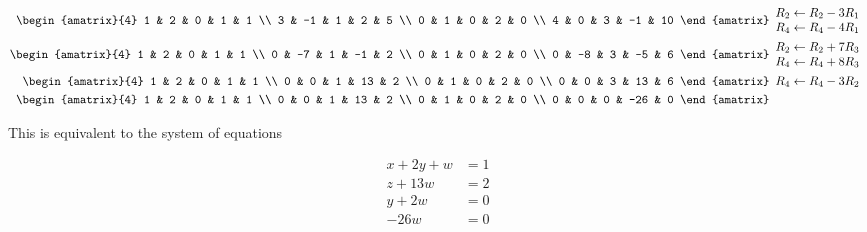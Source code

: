 \documentclass{article}
\begin{document}
\begin{align}
 \begin{amatrix}{4}
  1 & 2 & 0 & 1 & 1 \\
  3 & -1 & 1 & 2 & 5 \\
  0 & 1 & 0 & 2 & 0 \\
  4 & 0 & 3 & -1 & 10
 \end{amatrix}&
 \begin{array}{l}
  R_2 \leftarrow R_2 - 3R_1 \\ R_4 \leftarrow R_4 - 4R_1 
 \end{array}
 \nonumber \\
 \begin{amatrix}{4}
  1 & 2 & 0 & 1 & 1 \\
  0 & -7 & 1 & -1 & 2 \\
  0 & 1 & 0 & 2 & 0 \\
  0 & -8 & 3 & -5 & 6
 \end{amatrix}&
 \begin{array}{l}
  R_2 \leftarrow R_2 + 7R_3 \\ R_4 \leftarrow R_4 + 8R_3
 \end{array}
 \nonumber \\
 \begin{amatrix}{4}
  1 & 2 & 0 & 1 & 1 \\
  0 & 0 & 1 & 13 & 2 \\
  0 & 1 & 0 & 2 & 0 \\
  0 & 0 & 3 & 13 & 6
 \end{amatrix}&
 \begin{array}{l}
  R_4 \leftarrow R_4 - 3R_2
 \end{array}
 \nonumber \\
 \begin{amatrix}{4}
  1 & 2 & 0 & 1 & 1 \\
  0 & 0 & 1 & 13 & 2 \\
  0 & 1 & 0 & 2 & 0 \\
  0 & 0 & 0 & -26 & 0
 \end{amatrix}
 \nonumber
\end{align}

This is equivalent to the system of equations

\begin{align}
 x + 2y + w &= 1 \nonumber \\
 z + 13w &= 2 \nonumber \\
 y + 2w &= 0 \label{q2_a:a} \\
 -26w &= 0 \label{q2_a:b}
\end{align}
\end{document}
